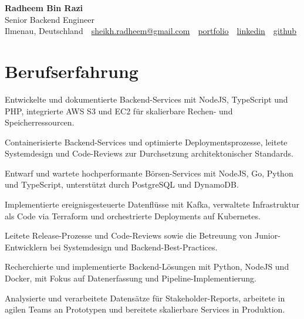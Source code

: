 \documentclass[11pt,a4paper]{resume}
\makeatletter
\newcommand{\Portfolio}{https://radheem.github.io/my-cv}
\newcommand{\PortfolioText}{portfolio}
\newcommand{\GitHub}{https://github.com/radheem}
\newcommand{\LinkedIn}{https://www.linkedin.com/in/radheem-razi}
\newcommand{\Email}{sheikh.radheem@gmail.com}
\makeatother
\begin{document}
\clearpage
{}

\begin{center}
  {\huge\bfseries Radheem Bin Razi}\\[3pt]
  {\large Senior Backend Engineer}\\[6pt]
  \small
  Ilmenau, Deutschland \,\textbar\,
  \href{mailto:\Email}{\Email} \,\textbar\,
  \href{\Portfolio}{\PortfolioText} \,\textbar\,
  \href{\LinkedIn}{linkedin} \,\textbar\,
  \href{\GitHub}{github}
\end{center}
\vspace{2pt}

\section{Berufserfahrung}

\bullets
  \item Entwickelte und dokumentierte Backend-Services mit NodeJS, TypeScript und PHP, integrierte AWS S3 und EC2 für skalierbare Rechen- und Speicherressourcen.
  \item Containerisierte Backend-Services und optimierte Deploymentsprozesse, leitete Systemdesign und Code-Reviews zur Durchsetzung architektonischer Standards.
\bulletsend
\vspace{3pt}
\bullets
  \item Entwarf und wartete hochperformante Börsen-Services mit NodeJS, Go, Python und TypeScript, unterstützt durch PostgreSQL und DynamoDB.
  \item Implementierte ereignisgesteuerte Datenflüsse mit Kafka, verwaltete Infrastruktur als Code via Terraform und orchestrierte Deployments auf Kubernetes.
  \item Leitete Release-Prozesse und Code-Reviews sowie die Betreuung von Junior-Entwicklern bei Systemdesign und Backend-Best-Practices.
\bulletsend
\vspace{3pt}
\bullets
  \item Recherchierte und implementierte Backend-Lösungen mit Python, NodeJS und Docker, mit Fokus auf Datenerfassung und Pipeline-Implementierung.
  \item Analysierte und verarbeitete Datensätze für Stakeholder-Reports, arbeitete in agilen Teams an Prototypen und bereitete skalierbare Services in Produktion.
\bulletsend
\vspace{3pt}
\end{document}
